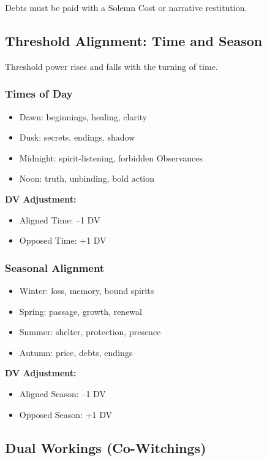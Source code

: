 \documentclass[11pt]{book}
\begin{document}
Debts must be paid with a Solemn Cost or narrative restitution.


\subsection*{Threshold Alignment: Time and Season}

Threshold power rises and falls with the turning of time.

\subsubsection*{Times of Day}
\begin{itemize}[noitemsep]
    \item Dawn: beginnings, healing, clarity
    \item Dusk: secrets, endings, shadow
    \item Midnight: spirit-listening, forbidden Observances
    \item Noon: truth, unbinding, bold action
\end{itemize}

\textbf{DV Adjustment:}
\begin{itemize}[noitemsep]
    \item Aligned Time: --1 DV
    \item Opposed Time: +1 DV
\end{itemize}

\subsubsection*{Seasonal Alignment}
\begin{itemize}[noitemsep]
    \item Winter: loss, memory, bound spirits
    \item Spring: passage, growth, renewal
    \item Summer: shelter, protection, presence
    \item Autumn: price, debts, endings
\end{itemize}

\textbf{DV Adjustment:}
\begin{itemize}[noitemsep]
    \item Aligned Season: --1 DV
    \item Opposed Season: +1 DV
\end{itemize}


\subsection*{Dual Workings (Co-Witchings)}
\end{document}
